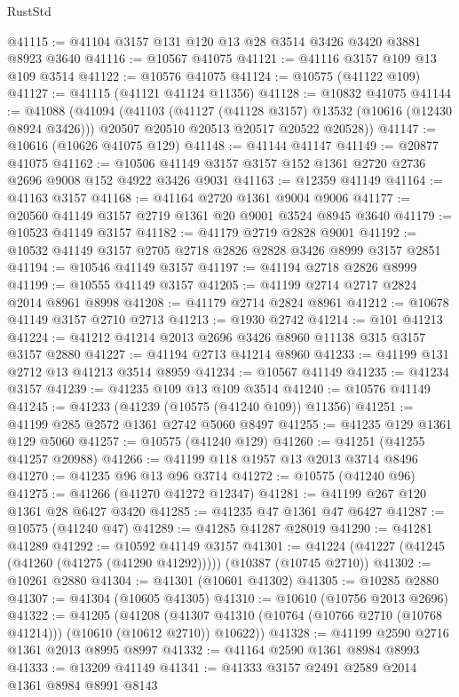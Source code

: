 \begin{lexlean}{RustStd}
\begin{coremodule}
@41115 := @41104 @3157 @131 @120 @13 @28 @3514 @3426 @3420 @3881 @8923 @3640
@41116 := @10567 @41075
@41121 := @41116 @3157 @109 @13 @109 @3514
@41122 := @10576 @41075
@41124 := @10575 (@41122 @109)
@41127 := @41115 (@41121 @41124 @11356)
@41128 := @10832 @41075
@41144 := @41088
    (@41094
      (@41103
        (@41127 (@41128 @3157) @13532 (@10616 (@12430 @8924 @3426)))
        @20507
        @20510
        @20513
        @20517
        @20522
        @20528))
@41147 := @10616 (@10626 @41075 @129)
@41148 := @41144 @41147
@41149 := @20877 @41075
@41162 := @10506 @41149 @3157 @3157 @152 @1361 @2720 @2736 @2696 @9008 @152 @4922 @3426 @9031
@41163 := @12359 @41149
@41164 := @41163 @3157
@41168 := @41164 @2720 @1361 @9004 @9006
@41177 := @20560 @41149 @3157 @2719 @1361 @20 @9001 @3524 @8945 @3640
@41179 := @10523 @41149 @3157
@41182 := @41179 @2719 @2828 @9001
@41192 := @10532 @41149 @3157 @2705 @2718 @2826 @2828 @3426 @8999 @3157 @2851
@41194 := @10546 @41149 @3157
@41197 := @41194 @2718 @2826 @8999
@41199 := @10555 @41149 @3157
@41205 := @41199 @2714 @2717 @2824 @2014 @8961 @8998
@41208 := @41179 @2714 @2824 @8961
@41212 := @10678 @41149 @3157 @2710 @2713
@41213 := @1930 @2742
@41214 := @101 @41213
@41224 := @41212 @41214 @2013 @2696 @3426 @8960 @11138 @315 @3157 @3157 @2880
@41227 := @41194 @2713 @41214 @8960
@41233 := @41199 @131 @2712 @13 @41213 @3514 @8959
@41234 := @10567 @41149
@41235 := @41234 @3157
@41239 := @41235 @109 @13 @109 @3514
@41240 := @10576 @41149
@41245 := @41233 (@41239 (@10575 (@41240 @109)) @11356)
@41251 := @41199 @285 @2572 @1361 @2742 @5060 @8497
@41255 := @41235 @129 @1361 @129 @5060
@41257 := @10575 (@41240 @129)
@41260 := @41251 (@41255 @41257 @20988)
@41266 := @41199 @118 @1957 @13 @2013 @3714 @8496
@41270 := @41235 @96 @13 @96 @3714
@41272 := @10575 (@41240 @96)
@41275 := @41266 (@41270 @41272 @12347)
@41281 := @41199 @267 @120 @1361 @28 @6427 @3420
@41285 := @41235 @47 @1361 @47 @6427
@41287 := @10575 (@41240 @47)
@41289 := @41285 @41287 @28019
@41290 := @41281 @41289
@41292 := @10592 @41149 @3157
@41301 := @41224 (@41227 (@41245 (@41260 (@41275 (@41290 @41292))))) (@10387 (@10745 @2710))
@41302 := @10261 @2880
@41304 := @41301 (@10601 @41302)
@41305 := @10285 @2880
@41307 := @41304 (@10605 @41305)
@41310 := @10610 (@10756 @2013 @2696)
@41322 := @41205
    (@41208 (@41307 @41310 (@10764 (@10766 @2710 (@10768 @41214))) (@10610 (@10612 @2710)) @10622))
@41328 := @41199 @2590 @2716 @1361 @2013 @8995 @8997
@41332 := @41164 @2590 @1361 @8984 @8993
@41333 := @13209 @41149
@41341 := @41333 @3157 @2491 @2589 @2014 @1361 @8984 @8991 @8143

\end{coremodule}
\end{lexlean}
